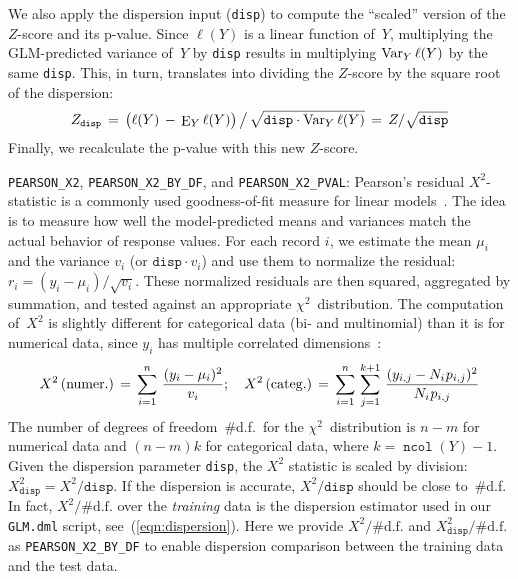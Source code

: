 We also apply the dispersion input ({\tt disp}) to compute the ``scaled'' version of the $Z$-score
and its p-value.  Since $\ell(Y)$ is a linear function of~$Y$, multiplying the GLM-predicted
variance of~$Y$ by {\tt disp} results in multiplying $\mathop{\mathrm{Var}}\nolimits_Y \ell(Y)$ by the same {\tt disp}.  This, in turn,
translates into dividing the $Z$-score by the square root of the dispersion:
\begin{equation*}
Z_{\texttt{disp}}  \,=\, \big(\ell(Y) \,-\, \mathop{\mathrm{E}}\nolimits_Y \ell(Y)\big) \,\big/\, \sqrt{\texttt{disp}\cdot\mathop{\mathrm{Var}}\nolimits_Y \ell(Y)}
\,=\, Z / \sqrt{\texttt{disp}}
\end{equation*}
Finally, we recalculate the p-value with this new $Z$-score.

\smallskip
{\tt PEARSON\_X2}, {\tt PEARSON\_X2\_BY\_DF}, and {\tt PEARSON\_X2\_PVAL}:
Pearson's residual $X^2$-statistic is a commonly used goodness-of-fit measure for linear models~\cite{McCullagh1989:GLM}.
The idea is to measure how well the model-predicted means and variances match the actual behavior
of response values.  For each record $i$, we estimate the mean $\mu_i$ and the variance $v_i$
(or $\texttt{disp}\cdot v_i$) and use them to normalize the residual: 
$r_i = (y_i - \mu_i) / \sqrt{v_i}$.  These normalized residuals are then squared, aggregated
by summation, and tested against an appropriate $\chi^2$~distribution.  The computation of~$X^2$
is slightly different for categorical data (bi- and multinomial) than it is for numerical data,
since $y_i$ has multiple correlated dimensions~\cite{McCullagh1989:GLM}:
\begin{equation*}
X^2\,\textrm{(numer.)} \,=\,  \sum_{i=1}^{n}\, \frac{(y_i - \mu_i)^2}{v_i};\quad
X^2\,\textrm{(categ.)} \,=\,  \sum_{i=1}^{n}\, \sum_{j=1}^{k+1} \,\frac{(y_{i,j} - N_i 
\hspace{0.5pt} p_{i,j})^2}{N_i \hspace{0.5pt} p_{i,j}}
\end{equation*}
The number of degrees of freedom~\#d.f.\ for the $\chi^2$~distribution is $n - m$ for numerical data and
$(n - m)k$ for categorical data, where $k = \mathop{\texttt{ncol}}(Y) - 1$.  Given the dispersion
parameter {\tt disp}, the $X^2$ statistic is scaled by division: \mbox{$X^2_{\texttt{disp}} = X^2 / \texttt{disp}$}.
If the dispersion is accurate, $X^2 / \texttt{disp}$ should be close to~\#d.f.  In fact, $X^2 / \textrm{\#d.f.}$
over the \emph{training} data is the dispersion estimator used in our {\tt GLM.dml} script, 
see~(\ref{eqn:dispersion}).  Here we provide $X^2 / \textrm{\#d.f.}$ and $X^2_{\texttt{disp}} / \textrm{\#d.f.}$
as {\tt PEARSON\_X2\_BY\_DF} to enable dispersion comparison between the training data and
the test data.

